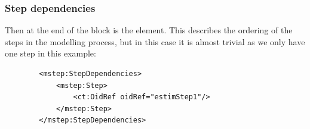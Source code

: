 \subsubsection{Step dependencies}

Then at the end of the  block is the  element. 
This describes the ordering of the steps in the modelling process, but in this case it is 
almost trivial as we only have one step in this example:
\lstset{language=XML}
\begin{lstlisting}
        <mstep:StepDependencies>
            <mstep:Step>
                <ct:OidRef oidRef="estimStep1"/>
            </mstep:Step>
        </mstep:StepDependencies>
\end{lstlisting}







